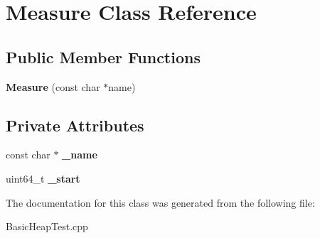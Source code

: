 \hypertarget{class_measure}{}\section{Measure Class Reference}
\label{class_measure}
\subsection*{Public Member Functions}
\begin{DoxyCompactItemize}
\item 
\mbox{\label{class_measure_a4fb5486d6539300233b0d2cd6de0b35b}} 
{\bfseries Measure} (const char $\ast$name)
\end{DoxyCompactItemize}
\subsection*{Private Attributes}
\begin{DoxyCompactItemize}
\item 
\mbox{\label{class_measure_ac67677826086335400c3d01e695b518c}} 
const char $\ast$ {\bfseries \+\_\+name}
\item 
\mbox{\label{class_measure_a65f186a7ca1e5002855a594cdac8115f}} 
uint64\+\_\+t {\bfseries \+\_\+start}
\end{DoxyCompactItemize}


The documentation for this class was generated from the following file\+:\begin{DoxyCompactItemize}
\item 
Basic\+Heap\+Test.\+cpp\end{DoxyCompactItemize}
